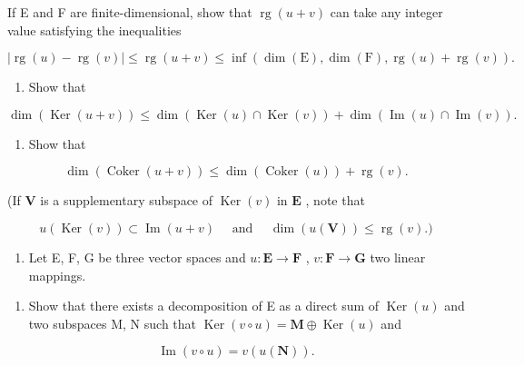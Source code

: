 If E and F are finite-dimensional, show that \(\operatorname{rg}(u + v)\) can take any integer value satisfying the inequalities

\[
\left| \operatorname{rg} (u) - \operatorname{rg} (v) \right| \leqslant \operatorname{rg} (u + v) \leqslant \inf (\dim (\mathrm{E}), \dim (\mathrm{F}), \operatorname{rg} (u) + \operatorname{rg} (v)).
\]

\begin{enumerate}
\def\labelenumi{(\alph{enumi})}
\setcounter{enumi}{1}
\tightlist
\item
  Show that
\end{enumerate}

\[
\dim (\operatorname{Ker} (u + v)) \leqslant \dim (\operatorname{Ker} (u) \cap \operatorname{Ker} (v)) + \dim (\operatorname{Im} (u) \cap \operatorname{Im} (v)).
\]

\begin{enumerate}
\def\labelenumi{(\alph{enumi})}
\setcounter{enumi}{2}
\tightlist
\item
  Show that
\end{enumerate}

\[
\dim (\operatorname{Coker} (u + v)) \leqslant \dim (\operatorname{Coker} (u)) + \operatorname{rg} (v).
\]

(If \(\mathbf{V}\) is a supplementary subspace of \(\operatorname{Ker}(v)\) in \(\mathbf{E}\) , note that

\[
u (\operatorname{Ker} (v)) \subset \operatorname{Im} (u + v) \quad \text { and } \quad \dim (u (\mathbf {V})) \leqslant \operatorname{rg} (v).)
\]

\begin{enumerate}
\def\labelenumi{\arabic{enumi}.}
\setcounter{enumi}{12}
\tightlist
\item
  Let E, F, G be three vector spaces and \(u: \mathbf{E} \to \mathbf{F}\) , \(v: \mathbf{F} \to \mathbf{G}\) two linear mappings.
\end{enumerate}

\begin{enumerate}
\def\labelenumi{(\alph{enumi})}
\tightlist
\item
  Show that there exists a decomposition of E as a direct sum of \(\operatorname{Ker}(u)\) and two subspaces M, N such that \(\operatorname{Ker}(v \circ u) = \mathbf{M} \oplus \operatorname{Ker}(u)\) and
\end{enumerate}

\[
\operatorname{Im} (v \circ u) = v (u (\mathbf {N})).
\]

